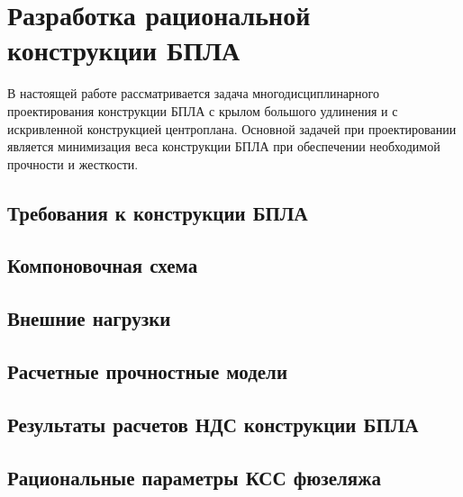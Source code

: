 \chapter{Разработка рациональной конструкции БПЛА}

В настоящей работе рассматривается задача многодисциплинарного проектирования конструкции БПЛА с крылом большого удлинения и с искривленной конструкцией центроплана.  Основной задачей при проектировании является минимизация веса конструкции БПЛА при обеспечении необходимой прочности и жесткости.

\section{Требования к конструкции БПЛА}



\section{Компоновочная схема}
	

\section{Внешние нагрузки}
\label{sec:externalLoads}



\section{Расчетные прочностные модели}




\section{Результаты расчетов НДС конструкции БПЛА} 


\section{Рациональные параметры КСС фюзеляжа}
